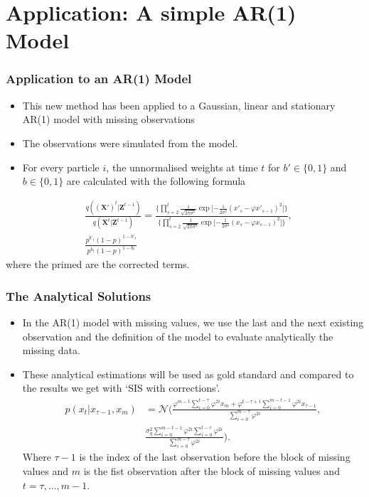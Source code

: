 \documentclass[9pt, xcolor={dvipsnames,svgnames,table}]{beamer}
\begin{document}
\section{Application: A simple AR(1) Model}

\begin{frame}
    \frametitle{Application to an AR(1) Model}
    \begin{itemize}
    \setlength\itemsep{2em}
        \item This new method has been applied to a Gaussian, linear and stationary AR(1) model with missing observations
        \item The observations were simulated from the model.
        \item For every particle $i$, the unnormalised weights at time $t$ for $b' \in \{0,1\}$ and $b \in \{0,1\}$ are calculated with the following formula
        \end{itemize}
    \begin{align*} \label{eq:2}
        &\frac{q(\bm{(X')}^{t} | \bm{Z}^{t-1}) }{q(\bm{X}^{t} | \bm{Z}^{t-1})} =
        \frac{\bigg \{ \prod_{s=2}^{t}  \frac{1}{\sqrt{2 \pi \sigma^{2}}} \exp \bigg [ { - \frac{1}{2 \sigma^{2}} }  (x'_s - \varphi x'_{s-1})^{2} \bigg ] \bigg \} }{\bigg \{ \prod_{s=2}^{t}  \frac{1}{\sqrt{2 \pi \sigma^{2}}} \exp \bigg [ { - \frac{1}{2 \sigma^{2}} }  (x_s - \varphi x_{s-1})^{2} \bigg ] \bigg \} } \nonumber, \\
        &\frac{p^{b'_t} (1 - p)^{1-b'_t}  }{ p^{b_t} (1 - p)^{1-b_t} }
    \end{align*}
    where the primed are the corrected terms.
\end{frame}


\begin{frame}
    \frametitle{The Analytical Solutions}
    \begin{itemize}
        \item In the AR(1) model with missing values, we use the last and the next existing observation and the definition of the model to evaluate analytically the missing data.
        \item These analytical estimations will be used as gold standard and compared to the results we get with `SIS with corrections'.
        \begin{align*}
            p(x_t | x_{\tau-1}, x_{m}) &= \mathcal{N} \Bigg(\frac{\varphi^{m-t} \sum_{i=0}^{t-\tau} \varphi^{2i} x_{m} + \varphi^{t-\tau+1} \sum_{i=0}^{m-t-1} \varphi^{2i} x_{\tau-1}}{\sum_{i=0}^{m-\tau} \varphi^{2i}}, \\
        & \frac{\sigma^2_\eta \sum_{i=0}^{m-t-1} \varphi^{2i} \sum_{i=0}^{t-\tau} \varphi^{2i}}{\sum_{i=0}^{m-\tau} \varphi^{2i}} \Bigg).
        \end{align*}
        Where $\tau-1$ is the index of the last observation before the block of missing values and $m$ is the fist observation after the block of missing values and $t = \tau, \dots, m-1$.
    \end{itemize}
\end{frame}
\end{document}
